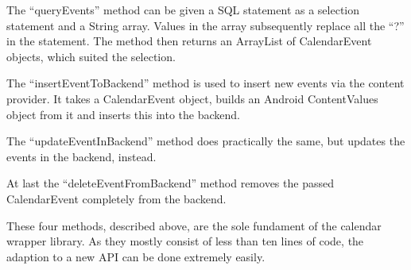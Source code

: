 The ``queryEvents'' method can be given a SQL statement as a selection
statement and a String array. Values in the array subsequently replace all
the ``?'' in the statement. The method then returns an ArrayList of
CalendarEvent objects, which suited the selection.

The ``insertEventToBackend'' method is used to insert new events via the
content provider. It takes a CalendarEvent object, builds an Android
ContentValues object from it and inserts this into the backend.

The ``updateEventInBackend'' method does practically the same, but updates
the events in the backend, instead.

At last the ``deleteEventFromBackend'' method removes the passed CalendarEvent
completely from the backend.

These four methods, described above, are the sole fundament of the calendar
wrapper library. As they mostly consist of less than ten lines of code,
the adaption to a new API can be done extremely easily.

